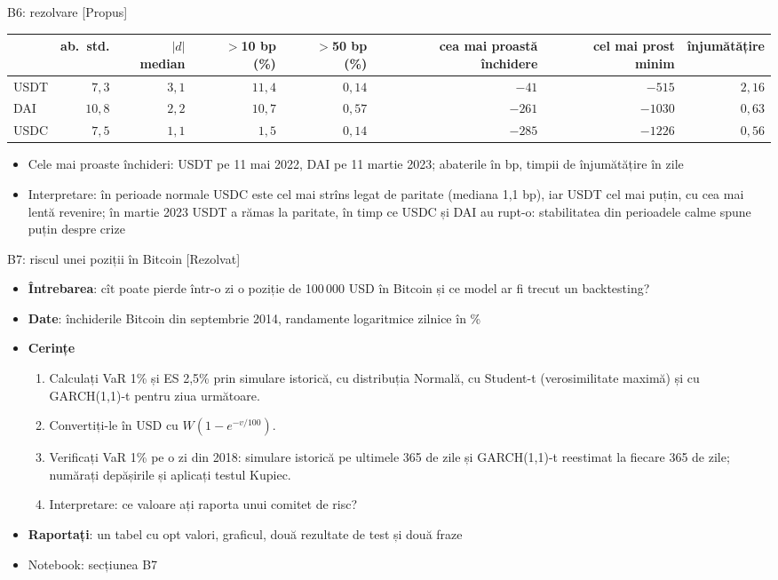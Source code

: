 \ifsolutions
\begin{frame}{B6: rezolvare [Propus]}
\itemsize{\footnotesize}
\begin{center}
\scriptsize
\begin{tabular}{lrrrrrrr}
\toprule
& ab.\ std. & $|d|$ median & $>$10 bp (\%) & $>$50 bp (\%) & cea mai proastă închidere & cel mai prost minim & înjumătățire \\
\midrule
USDT & $7{,}3$ & $3{,}1$ & $11{,}4$ & $0{,}14$ & $-41$ & $-515$ & $2{,}16$ \\
DAI & $10{,}8$ & $2{,}2$ & $10{,}7$ & $0{,}57$ & $-261$ & $-1030$ & $0{,}63$ \\
USDC & $7{,}5$ & $1{,}1$ & $1{,}5$ & $0{,}14$ & $-285$ & $-1226$ & $0{,}56$ \\
\bottomrule
\end{tabular}
\end{center}
\begin{itemize}
    \item Cele mai proaste închideri: USDT pe 11 mai 2022, DAI pe 11 martie 2023; abaterile în bp, timpii de înjumătățire în zile
    \item Interpretare: în perioade normale USDC este cel mai strîns legat de paritate (mediana 1{,}1 bp), iar USDT cel mai puțin, cu cea mai lentă revenire; în martie 2023 USDT a rămas la paritate, în timp ce USDC și DAI au rupt-o: stabilitatea din perioadele calme spune puțin despre crize
\end{itemize}
\end{frame}
\fi

\begin{frame}{B7: riscul unei poziții în Bitcoin [Rezolvat]}
\itemsize{\footnotesize}
\begin{itemize}
\item \textbf{Întrebarea}: cît poate pierde într-o zi o poziție de 100\,000 USD în Bitcoin și ce model ar fi trecut un backtesting?
\item \textbf{Date}: închiderile Bitcoin din septembrie 2014, randamente logaritmice zilnice în \%
\item \textbf{Cerințe}
\begin{enumerate}
    \item Calculați VaR 1\% și ES 2,5\% prin simulare istorică, cu distribuția Normală, cu Student-t (verosimilitate maximă) și cu GARCH(1,1)-t pentru ziua următoare.
    \item Convertiți-le în USD cu $W(1 - e^{-v/100})$.
    \item Verificați VaR 1\% pe o zi din 2018: simulare istorică pe ultimele 365 de zile și GARCH(1,1)-t reestimat la fiecare 365 de zile; numărați depășirile și aplicați testul Kupiec.
    \item Interpretare: ce valoare ați raporta unui comitet de risc?
\end{enumerate}
\item \textbf{Raportați}: un tabel cu opt valori, graficul, două rezultate de test și două fraze
\item Notebook: secțiunea B7
\end{itemize}
\end{frame}

